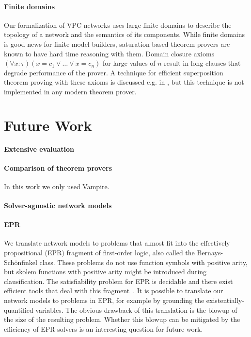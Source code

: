 \paragraph{Finite domains}
Our formalization of VPC networks uses large finite domains to describe the topology of a network and the semantics of its components. While finite domains is good news for finite model builders, saturation-based theorem provers are known to have hard time reasoning with them. Domain closure axioms $(\forall x:\tau)(x=c_1 \vee\ldots\vee x=c_n)$ for large values of $n$ result in long clauses that degrade performance of the prover. A technique for efficient superposition theorem proving with these axioms is discussed e.g. in \cite{HillenbrandWeidenbach13}, but this technique is not implemented in any modern theorem prover.

\section{Future Work}
\label{sect:aws/future-work}

\paragraph{Extensive evaluation}

\paragraph{Comparison of theorem provers}
In this work we only used Vampire. 

\paragraph{Solver-agnostic network models}

\paragraph{EPR}
We translate network models to problems that almost fit into the effectively propositional (EPR) fragment of first-order logic, also called the Bernays-Sch\"onfinkel class. These problems do not use function symbols with positive arity, but skolem functions with positive arity might be introduced during clausification. The satisfiability problem for EPR is decidable and there exist efficient tools that deal with this fragment~\cite{DBLP:conf/birthday/Korovin13}. It is possible to translate our network models to problems in EPR, for example by grounding the existentially-quantified variables. The obvious drawback of this translation is the blowup of the size of the resulting problem. Whether this blowup can be mitigated by the efficiency of EPR solvers is an interesting question for future work.

